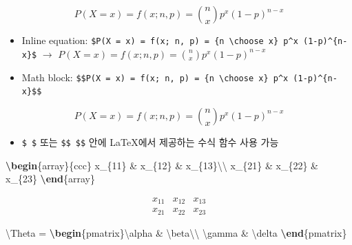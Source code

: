 \documentclass[
  11pt,
]{krantz}
\newenvironment{Shaded}{\begin{snugshade}}{\end{snugshade}}
\newcommand{\ExtensionTok}[1]{#1}
\newcommand{\KeywordTok}[1]{\textcolor[rgb]{0.27,0.27,0.27}{\textbf{#1}}}
\newcommand{\NormalTok}[1]{#1}
\newcommand{\SpecialCharTok}[1]{\textcolor[rgb]{0,0,0}{#1}}
\newcommand{\SpecialStringTok}[1]{\textcolor[rgb]{0.5,0.5,0.5}{#1}}
\providecommand{\tightlist}{%
  \setlength{\itemsep}{0pt}\setlength{\parskip}{0pt}}
\begin{document}
\[
  P(X = x) = f(x; n, p) = {n \choose x} p^x (1-p)^{n-x}
\]

\begin{itemize}
\tightlist
\item
  Inline equation: \texttt{\$P(X\ =\ x)\ =\ f(x;\ n,\ p)\ =\ \{n\ \textbackslash{}choose\ x\}\ p\^{}x\ (1-p)\^{}\{n-x\}\$} \(\rightarrow\) \(P(X = x) = f(x; n, p) = {n \choose x} p^x (1-p)^{n-x}\)
\item
  Math block: \texttt{\$\$P(X\ =\ x)\ =\ f(x;\ n,\ p)\ =\ \{n\ \textbackslash{}choose\ x\}\ p\^{}x\ (1-p)\^{}\{n-x\}\$\$}
\end{itemize}

\[P(X = x) = f(x; n, p) = {n \choose x} p^x (1-p)^{n-x}\]

\begin{itemize}
\tightlist
\item
  \texttt{\$\ \$} 또는 \texttt{\$\$\ \$\$} 안에 LaTeX에서 제공하는 수식 함수 사용 가능
\end{itemize}

\begin{Shaded}
\begin{Highlighting}[]
\SpecialStringTok{$$}\KeywordTok{\textbackslash{}begin}\NormalTok{\{}\ExtensionTok{array}\NormalTok{\}}\SpecialStringTok{\{ccc\}}
\SpecialStringTok{x\_\{11\} \& x\_\{12\} \& x\_\{13\}}\SpecialCharTok{\textbackslash{}\textbackslash{}}
\SpecialStringTok{x\_\{21\} \& x\_\{22\} \& x\_\{23\}}
\KeywordTok{\textbackslash{}end}\NormalTok{\{}\ExtensionTok{array}\NormalTok{\}}\SpecialStringTok{$$}
\end{Highlighting}
\end{Shaded}

\[\begin{array}{ccc}
x_{11} & x_{12} & x_{13}\\
x_{21} & x_{22} & x_{23}
\end{array}\]

\begin{Shaded}
\begin{Highlighting}[]
\SpecialStringTok{$$}\SpecialCharTok{\textbackslash{}Theta}\SpecialStringTok{ = }\KeywordTok{\textbackslash{}begin}\NormalTok{\{}\ExtensionTok{pmatrix}\NormalTok{\}}\SpecialCharTok{\textbackslash{}alpha}\SpecialStringTok{ \& }\SpecialCharTok{\textbackslash{}beta\textbackslash{}\textbackslash{}}
\SpecialCharTok{\textbackslash{}gamma}\SpecialStringTok{ \& }\SpecialCharTok{\textbackslash{}delta}
\KeywordTok{\textbackslash{}end}\NormalTok{\{}\ExtensionTok{pmatrix}\NormalTok{\}}\SpecialStringTok{$$}
\end{Highlighting}
\end{Shaded}
\end{document}
